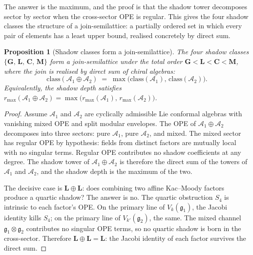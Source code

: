 \documentclass[11pt]{article}
\theoremstyle{plain}
\newtheorem{proposition}[theorem]{Proposition}
\theoremstyle{definition}
\theoremstyle{remark}
\providecommand{\fg}{\mathfrak{g}}
\providecommand{\cA}{\mathcal{A}}
\begin{document}
The answer is the maximum, and the proof is that the shadow
tower decomposes sector by sector when the cross-sector OPE is
regular. This gives the four shadow classes the structure of
a join-semilattice: a partially ordered set in which every pair
of elements has a least upper bound, realised concretely by
direct sum.

\begin{proposition}[Shadow classes form a join-semilattice]
\label{prop:shadow-semilattice-standalone}
The four shadow classes $\{\mathbf{G},\, \mathbf{L},\,
\mathbf{C},\, \mathbf{M}\}$ form a join-semilattice under the
total order $\mathbf{G} < \mathbf{L} < \mathbf{C} < \mathbf{M}$,
where the join is realised by direct sum of chiral algebras:
\begin{equation}\label{eq:shadow-join}
 \mathrm{class}(\cA_1 \oplus \cA_2)
 \;=\;
 \max\bigl(\mathrm{class}(\cA_1),\,
 \mathrm{class}(\cA_2)\bigr).
\end{equation}
Equivalently, the shadow depth satisfies
$r_{\max}(\cA_1 \oplus \cA_2)
= \max\bigl(r_{\max}(\cA_1),\, r_{\max}(\cA_2)\bigr)$.
\end{proposition}

\begin{proof}
Assume $\cA_1$ and $\cA_2$ are cyclically admissible Lie conformal
algebras with vanishing mixed OPE and split modular envelopes. The OPE
of $\cA_1 \oplus \cA_2$ decomposes into three sectors:
pure $\cA_1$, pure $\cA_2$, and mixed. The mixed sector has
regular OPE by hypothesis: fields from distinct factors are mutually
local with no singular terms.
Regular OPE contributes no shadow coefficients at any degree.
The shadow tower of $\cA_1 \oplus \cA_2$ is therefore the
direct sum of the towers of $\cA_1$ and $\cA_2$, and the shadow
depth is the maximum of the two.

The decisive case is $\mathbf{L} \oplus \mathbf{L}$: does
combining two affine Kac--Moody factors produce a quartic
shadow? The answer is no. The quartic obstruction $S_4$
is intrinsic to each factor's OPE. On the primary line of
$V_k(\fg_1)$, the Jacobi identity kills $S_4$; on the primary
line of $V_{k'}(\fg_2)$, the same. The mixed channel
$\fg_1 \otimes \fg_2$ contributes no singular OPE terms, so
no quartic shadow is born in the cross-sector. Therefore
$\mathbf{L} \oplus \mathbf{L} = \mathbf{L}$: the Jacobi identity
of each factor survives the direct sum.
\end{proof}
\end{document}
